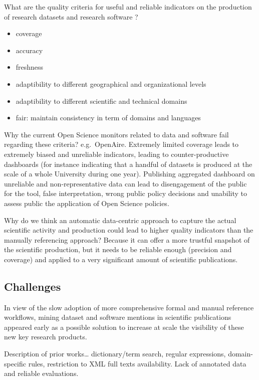 \documentclass[
]{article}
\begin{document}
What are the quality criteria for useful and reliable indicators on the
production of research datasets and research software ?

\begin{itemize}
\item
  coverage
\item
  accuracy
\item
  freshness
\item
  adaptibility to different geographical and organizational levels
\item
  adaptibility to different scientific and technical domains
\item
  fair: maintain consistency in term of domains and languages
\end{itemize}

Why the current Open Science monitors related to data and software fail
regarding these criteria? e.g.~OpenAire. Extremely limited coverage
leads to extremely biased and unreliable indicators, leading to
counter-productive dashboards (for instance indicating that a handful of
datasets is produced at the scale of a whole University during one
year). Publishing aggregated dashboard on unreliable and
non-representative data can lead to disengagement of the public for the
tool, false interpretation, wrong public policy decisions and unability
to assess public the application of Open Science policies.

Why do we think an automatic data-centric approach to capture the actual
scientific activity and production could lead to higher quality
indicators than the manually referencing approach? Because it can offer
a more trustful snapshot of the scientific production, but it needs to
be reliable enough (precision and coverage) and applied to a very
significant amount of scientific publications.

\hypertarget{challenges}{%
\subsection{Challenges}\label{challenges}}

In view of the slow adoption of more comprehensive formal and manual
reference workflows, mining dataset and software mentions in scientific
publications appeared early as a possible solution to increase at scale
the visibility of these new key research products.

Description of prior works\ldots{} dictionary/term search, regular
expressions, domain-specific rules, restriction to XML full texts
availability. Lack of annotated data and reliable evaluations.
\end{document}
